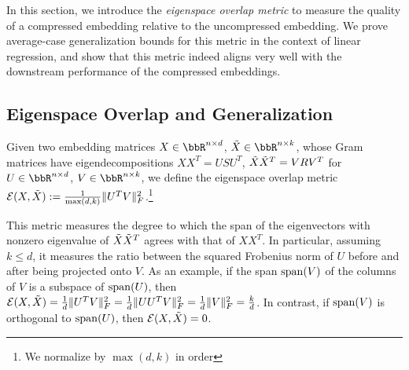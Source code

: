 %	


In this section, we introduce the \textit{eigenspace overlap metric} to measure the quality of a compressed embedding relative to the uncompressed embedding.
We prove average-case generalization bounds for this metric in the context of linear regression, and show that this metric indeed aligns very well with the downstream performance of the compressed embeddings.

\subsection{Eigenspace Overlap and Generalization}
\label{subsec:eigen_overlap}
\begin{definition}
Given two embedding matrices $X \in \RR^{n \times d}$, $\tX \in \RR^{n \times k}$, whose Gram matrices have eigendecompositions $XX^T = USU^T$, $\tX\tX^T = VRV^T$ for $U \in \RR^{n\times d}$, $V\in \RR^{n \times k}$, we define the eigenspace overlap metric $\eigover(X,\tX) \defeq  \frac{1}{\max(d,k)}\|U^T V\|_F^2$.\footnote{We normalize by $\max(d,k)$ in order}
\end{definition}

This metric measures the degree to which the span of the eigenvectors with nonzero eigenvalue of $\tX\tX^T$ agrees with that of $XX^T$.
In particular, assuming $k\leq d$, it measures the ratio between the squared Frobenius norm of $U$ before and after being projected onto $V$.
As an example, if the span $\Span(V)$ of the columns of $V$ is a subspace of $\Span(U)$, then $\eigover(X,\tX) = \frac{1}{d}\|U^T V\|_F^2 = \frac{1}{d}\|UU^T V\|_F^2 = \frac{1}{d}\|V\|_F^2 = \frac{k}{d}$.
In contrast, if $\Span(V)$ is orthogonal to $\Span(U)$, then $\eigover(X,\tX) = 0$.

